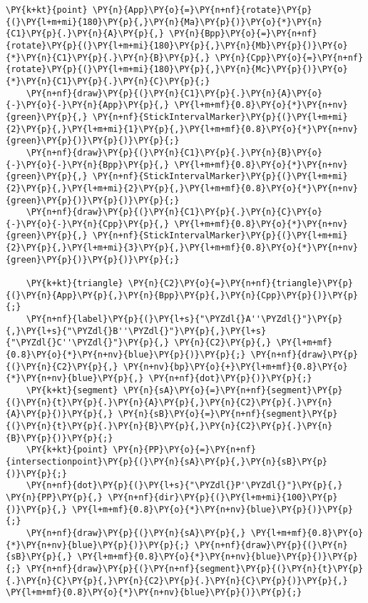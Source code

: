 \begin{Verbatim}[commandchars=\\\{\}]
    \PY{k+kt}{point} \PY{n}{App}\PY{o}{=}\PY{n+nf}{rotate}\PY{p}{(}\PY{l+m+mi}{180}\PY{p}{,}\PY{n}{Ma}\PY{p}{)}\PY{o}{*}\PY{n}{C1}\PY{p}{.}\PY{n}{A}\PY{p}{,} \PY{n}{Bpp}\PY{o}{=}\PY{n+nf}{rotate}\PY{p}{(}\PY{l+m+mi}{180}\PY{p}{,}\PY{n}{Mb}\PY{p}{)}\PY{o}{*}\PY{n}{C1}\PY{p}{.}\PY{n}{B}\PY{p}{,} \PY{n}{Cpp}\PY{o}{=}\PY{n+nf}{rotate}\PY{p}{(}\PY{l+m+mi}{180}\PY{p}{,}\PY{n}{Mc}\PY{p}{)}\PY{o}{*}\PY{n}{C1}\PY{p}{.}\PY{n}{C}\PY{p}{;}
    \PY{n+nf}{draw}\PY{p}{(}\PY{n}{C1}\PY{p}{.}\PY{n}{A}\PY{o}{-}\PY{o}{-}\PY{n}{App}\PY{p}{,} \PY{l+m+mf}{0.8}\PY{o}{*}\PY{n+nv}{green}\PY{p}{,} \PY{n+nf}{StickIntervalMarker}\PY{p}{(}\PY{l+m+mi}{2}\PY{p}{,}\PY{l+m+mi}{1}\PY{p}{,}\PY{l+m+mf}{0.8}\PY{o}{*}\PY{n+nv}{green}\PY{p}{)}\PY{p}{)}\PY{p}{;}
    \PY{n+nf}{draw}\PY{p}{(}\PY{n}{C1}\PY{p}{.}\PY{n}{B}\PY{o}{-}\PY{o}{-}\PY{n}{Bpp}\PY{p}{,} \PY{l+m+mf}{0.8}\PY{o}{*}\PY{n+nv}{green}\PY{p}{,} \PY{n+nf}{StickIntervalMarker}\PY{p}{(}\PY{l+m+mi}{2}\PY{p}{,}\PY{l+m+mi}{2}\PY{p}{,}\PY{l+m+mf}{0.8}\PY{o}{*}\PY{n+nv}{green}\PY{p}{)}\PY{p}{)}\PY{p}{;}
    \PY{n+nf}{draw}\PY{p}{(}\PY{n}{C1}\PY{p}{.}\PY{n}{C}\PY{o}{-}\PY{o}{-}\PY{n}{Cpp}\PY{p}{,} \PY{l+m+mf}{0.8}\PY{o}{*}\PY{n+nv}{green}\PY{p}{,} \PY{n+nf}{StickIntervalMarker}\PY{p}{(}\PY{l+m+mi}{2}\PY{p}{,}\PY{l+m+mi}{3}\PY{p}{,}\PY{l+m+mf}{0.8}\PY{o}{*}\PY{n+nv}{green}\PY{p}{)}\PY{p}{)}\PY{p}{;}

    \PY{k+kt}{triangle} \PY{n}{C2}\PY{o}{=}\PY{n+nf}{triangle}\PY{p}{(}\PY{n}{App}\PY{p}{,}\PY{n}{Bpp}\PY{p}{,}\PY{n}{Cpp}\PY{p}{)}\PY{p}{;}
    \PY{n+nf}{label}\PY{p}{(}\PY{l+s}{"\PYZdl{}A''\PYZdl{}"}\PY{p}{,}\PY{l+s}{"\PYZdl{}B''\PYZdl{}"}\PY{p}{,}\PY{l+s}{"\PYZdl{}C''\PYZdl{}"}\PY{p}{,} \PY{n}{C2}\PY{p}{,} \PY{l+m+mf}{0.8}\PY{o}{*}\PY{n+nv}{blue}\PY{p}{)}\PY{p}{;} \PY{n+nf}{draw}\PY{p}{(}\PY{n}{C2}\PY{p}{,} \PY{n+nv}{bp}\PY{o}{+}\PY{l+m+mf}{0.8}\PY{o}{*}\PY{n+nv}{blue}\PY{p}{,} \PY{n+nf}{dot}\PY{p}{)}\PY{p}{;}
    \PY{k+kt}{segment} \PY{n}{sA}\PY{o}{=}\PY{n+nf}{segment}\PY{p}{(}\PY{n}{t}\PY{p}{.}\PY{n}{A}\PY{p}{,}\PY{n}{C2}\PY{p}{.}\PY{n}{A}\PY{p}{)}\PY{p}{,} \PY{n}{sB}\PY{o}{=}\PY{n+nf}{segment}\PY{p}{(}\PY{n}{t}\PY{p}{.}\PY{n}{B}\PY{p}{,}\PY{n}{C2}\PY{p}{.}\PY{n}{B}\PY{p}{)}\PY{p}{;}
    \PY{k+kt}{point} \PY{n}{PP}\PY{o}{=}\PY{n+nf}{intersectionpoint}\PY{p}{(}\PY{n}{sA}\PY{p}{,}\PY{n}{sB}\PY{p}{)}\PY{p}{;}
    \PY{n+nf}{dot}\PY{p}{(}\PY{l+s}{"\PYZdl{}P'\PYZdl{}"}\PY{p}{,} \PY{n}{PP}\PY{p}{,} \PY{n+nf}{dir}\PY{p}{(}\PY{l+m+mi}{100}\PY{p}{)}\PY{p}{,} \PY{l+m+mf}{0.8}\PY{o}{*}\PY{n+nv}{blue}\PY{p}{)}\PY{p}{;}
    \PY{n+nf}{draw}\PY{p}{(}\PY{n}{sA}\PY{p}{,} \PY{l+m+mf}{0.8}\PY{o}{*}\PY{n+nv}{blue}\PY{p}{)}\PY{p}{;} \PY{n+nf}{draw}\PY{p}{(}\PY{n}{sB}\PY{p}{,} \PY{l+m+mf}{0.8}\PY{o}{*}\PY{n+nv}{blue}\PY{p}{)}\PY{p}{;} \PY{n+nf}{draw}\PY{p}{(}\PY{n+nf}{segment}\PY{p}{(}\PY{n}{t}\PY{p}{.}\PY{n}{C}\PY{p}{,}\PY{n}{C2}\PY{p}{.}\PY{n}{C}\PY{p}{)}\PY{p}{,} \PY{l+m+mf}{0.8}\PY{o}{*}\PY{n+nv}{blue}\PY{p}{)}\PY{p}{;}
\end{Verbatim}
